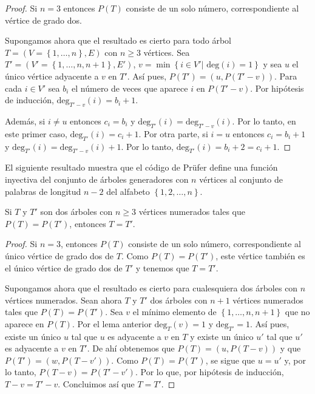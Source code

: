 \begin{proof}
Si $n = 3$ entonces $P(T)$ consiste de un solo número, correspondiente al vértice de grado dos.

Supongamos ahora que el resultado es cierto para todo árbol $T = (V=\left\lbrace 1,\dots, n \right\rbrace, E)$ con $n \geq 3$ vértices. Sea $T' = (V'=\left\lbrace 1,\dots, n,n+1 \right\rbrace, E')$, $v = \min \left\lbrace i \in V' | \text{ deg}(i) = 1 \right\rbrace$ y sea $u$ el único vértice adyacente a $v$ en $T'$. Así pues, $P(T') = (u,P(T'-v))$. Para cada $i \in V'$ sea $b_i$ el número de veces que aparece $i$ en $P(T'-v)$. Por hipótesis de inducción, $\text{deg}_{T'-v}(i) = b_i + 1$.

Además, si $i \neq u$ entonces $c_i = b_i$ y $\text{deg}_{T'}(i) = \text{deg}_{T'-v}(i)$. Por lo tanto, en este primer caso, $\text{deg}_{T'}(i) = c_i + 1$. Por otra parte, si $i = u$ entonces $c_i = b_i + 1$ y $\text{deg}_{T'}(i) = \text{deg}_{T'-v}(i) +1$. Por lo tanto, $\text{deg}_{T'}(i) = b_i + 2 = c_i + 1$.
\end{proof}

El siguiente resultado muestra que el código de Prüfer define una función inyectiva del conjunto de árboles generadores con $n$ vértices al conjunto de palabras de longitud $n-2$ del alfabeto $\left\lbrace 1,2,\dots, n\right\rbrace$.

\begin{proposition}\label{prop:2}
Si $T$ y $T'$ son dos árboles con $n \geq 3$ vértices numerados tales que $P(T) = P(T')$, entonces $T = T'$.
\end{proposition}

\begin{proof}
Si $n = 3$, entonces $P(T)$ consiste de un solo número, correspondiente al único vértice de grado dos de $T$. Como $P(T) = P(T')$, este vértice también es el único vértice de grado dos de $T'$ y tenemos que $T = T'$.

Supongamos ahora que el resultado es cierto para cualesquiera dos árboles con $n$ vértices numerados. Sean ahora $T$ y $T'$ dos árboles con $n+1$ vértices numerados tales que $P(T) = P(T')$.  Sea $v$ el mínimo elemento de $\left \lbrace 1,\dots,n,n+1\right \rbrace$ que no aparece en $P(T)$. Por el lema anterior $\text{deg}_T (v) = 1$ y $\text{deg}_{T'} = 1$. Así pues, existe un único $u$ tal que $u$ es adyacente a $v$ en $T$ y existe un único $u'$ tal que $u'$ es adyacente a $v$ en $T'$. De ahí obtenemos que $P(T) = (u,P(T-v))$ y que $P(T') = (w,P(T-v'))$. Como $P(T) = P(T')$, se sigue que $u = u'$ y, por lo tanto, $P(T-v) = P(T'-v')$. Por lo que, por hipótesis de inducción, $T-v = T'-v$. Concluimos así que $T=T'$.
\end{proof}

